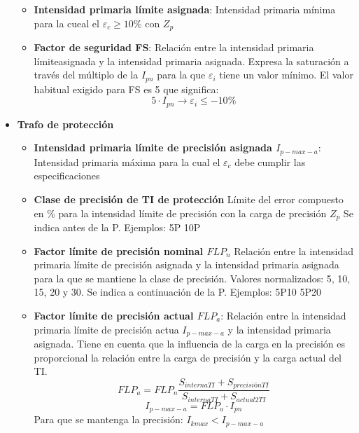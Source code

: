 \begin{itemize}
\begin{itemize}
\begin{itemize}
		\end{itemize}
		\item \textbf{Intensidad primaria límite asignada}: Intensidad primaria mínima para la cueal el $\varepsilon_c \ge 10\%$ con $Z_p$
		\item \textbf{Factor de seguridad FS}: Relación entre la intensidad primaria límiteasignada y la intensidad primaria asignada. Expresa la saturación a través del múltiplo de la $I_{pn}$ para la que $\varepsilon_i$ tiene un valor mínimo. El valor habitual exigido para FS es 5 que significa:
		\begin{equation}
			5\cdot I_{pn}  \rightarrow \varepsilon_i \le -10\%
		\end{equation}
	\end{itemize}
	\item \textbf{Trafo de protección}
	\begin{itemize}
		\item \textbf{Intensidad primaria límite de precisión asignada $ I_{p-max-a}$}:  Intensidad primaria máxima para la cual el $\varepsilon_c$ debe cumplir las especificaciones
		\item \textbf{Clase de precisión de TI de protección } Límite del error compuesto en \% para la intensidad límite de precisión con la carga de precisión $Z_p$ Se indica antes de la P. Ejemplos: 5P 10P
		\item \textbf{Factor límite de precisión nominal $FLP_n$} Relación entre la intensidad primaria límite de precisión asignada y la intensidad primaria asignada para la que se mantiene la clase de precisión. Valores normalizados: 5, 10, 15, 20 y 30. Se indica a continuación de la P. Ejemplos: 5P10 5P20
		\item \textbf{Factor límite de precisión actual $FLP_a$}: Relación entre la intensidad primaria límite de precisión actua $ I_{p-max-a}$ y la intensidad primaria asignada. Tiene en cuenta que la influencia de la carga en la precisión es proporcional la relación entre la carga de precisión y la carga actual del TI.
		\begin{equation}
			FLP_a=FLP_n\dfrac{S_{internaTI}+S_{precisiónTI}}{S_{internaTI}+S_{actual2TI}}
		\end{equation}
		\begin{equation}
			I_{p-max-a}=FLP_a\cdot I_{pn}
		\end{equation}
		Para que se mantenga la precisión:
		$I_{kmax}< I_{p-max-a}$
	\end{itemize}
\end{itemize}

